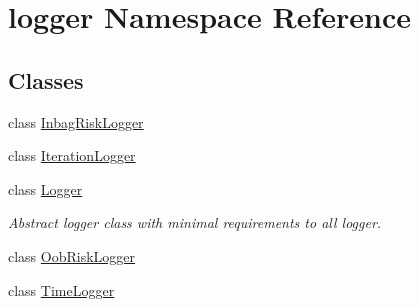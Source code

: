 \hypertarget{namespacelogger}{}\section{logger Namespace Reference}
\label{namespacelogger}
\subsection*{Classes}
\begin{DoxyCompactItemize}
\item 
class \mbox{\hyperlink{classlogger_1_1_inbag_risk_logger}{Inbag\+Risk\+Logger}}
\item 
class \mbox{\hyperlink{classlogger_1_1_iteration_logger}{Iteration\+Logger}}
\item 
class \mbox{\hyperlink{classlogger_1_1_logger}{Logger}}
\begin{DoxyCompactList}\small\item\em Abstract logger class with minimal requirements to all logger. \end{DoxyCompactList}\item 
class \mbox{\hyperlink{classlogger_1_1_oob_risk_logger}{Oob\+Risk\+Logger}}
\item 
class \mbox{\hyperlink{classlogger_1_1_time_logger}{Time\+Logger}}
\end{DoxyCompactItemize}
